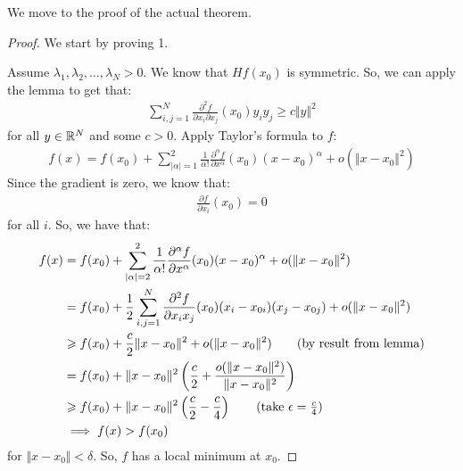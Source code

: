 \documentclass{report}
\begin{document}
\noindent We move to the proof of the actual theorem.
\begin{proof}
    We start by proving 1.

    \noindent Assume $\lambda_1, \lambda_2, \ldots, \lambda_N > 0$. We know that $Hf(x_0)$ is symmetric. So, we can apply the lemma to get that:
    \begin{align*}
        \sum_{i, j=1}^N \frac{\partial^2 f}{\partial x_i \partial x_j}(x_0)y_iy_j \geq c \Vert y \Vert^2
    \end{align*}
    for all $y \in \RR^N$ and some $c > 0$. Apply Taylor's formula to $f$:
    \begin{align*}
        f(x) = f(x_0) + \sum_{|\alpha| = 1}^2 \frac{1}{\alpha !}\frac{\partial^\alpha f}{\partial x^\alpha}(x_0)(x-x_0)^\alpha + o(\Vert x - x_0 \Vert^2)
    \end{align*}
    Since the gradient is zero, we know that:
    \begin{align*}
        \frac{\partial f}{\partial x_i}(x_0) = 0
    \end{align*}
    for all $i$. So, we have that:
    \begin{align*}
        f(x) &= f(x_0) + \sum_{|\alpha| = 2}^2 \frac{1}{\alpha !}\frac{\partial^\alpha f}{\partial x^\alpha}(x_0)(x-x_0)^\alpha + o(\Vert x - x_0 \Vert^2) \\
        &= f(x_0) + \frac{1}{2}\sum_{i , j = 1}^N \frac{\partial^2f}{\partial x_i x_j}(x_0)(x_i - x_{0i})(x_j - x_{0j}) + o(\Vert x - x_0 \Vert^2) \\
        &\geq f(x_0) + \frac{c}{2}\Vert x - x_0 \Vert^2 + o(\Vert x - x_0 \Vert^2) \tag{by result from lemma}\\
        &= f(x_0) + \Vert x - x_0 \Vert^2 \left( \frac{c}{2} + \frac{o(\Vert x - x_0 \Vert^2)}{\Vert x -x_0 \Vert^2} \right) \\
        &\geq f(x_0) + \Vert x - x_0 \Vert^2 \left( \frac{c}{2} - \frac{c}{4}\right) \tag{take $\epsilon = \frac{c}{4}$} \\
        &\implies f(x) > f(x_0)
    \end{align*}
    for $\Vert x - x_0 \Vert < \delta$. So, $f$ has a local minimum at $x_0$.


\end{proof}
\end{document}
